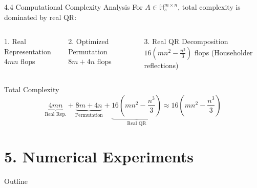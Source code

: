 \documentclass{beamer}
\begin{document}
\begin{frame}{4.4 Computational Complexity Analysis}
  For $A \in \mathbb{H}_s^{m \times n}$, total complexity is dominated by real QR:
  
  \begin{columns}[T]
    \begin{block}{1. Real Representation}
      $4mn$ flops
    \end{block}
    
    \begin{block}{2. Optimized Permutation}
      $8m + 4n$ flops
    \end{block}
    
    \begin{block}{3. Real QR Decomposition}
      $16\left(mn^2 - \frac{n^3}{3}\right)$ flops (Householder reflections)
    \end{block}
  \end{columns}
  
  \begin{block}{Total Complexity}
    \[
    \underbrace{4mn}_{\text{Real Rep.}} + \underbrace{8m+4n}_{\text{Permutation}} + \underbrace{16\left(mn^2 - \frac{n^3}{3}\right)}_{\text{Real QR}} \approx 16\left(mn^2 - \frac{n^3}{3}\right)
    \]
  \end{block}
\end{frame}

\section{5. Numerical Experiments}
\begin{frame}{Outline}
  \tableofcontents[sectionstyle=show/shaded, subsectionstyle=show/show/shaded]
\end{frame}
\end{document}
